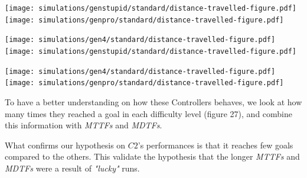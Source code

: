 \begin{minipage}[c]{\textwidth}
	\texttt{[image: simulations/genstupid/standard/distance-travelled-figure.pdf]}
	\vspace{0.5cm}
	\texttt{[image: simulations/genpro/standard/distance-travelled-figure.pdf]}
\end{minipage}

\begin{minipage}[c]{\textwidth}
	\texttt{[image: simulations/gen4/standard/distance-travelled-figure.pdf]}
	\vspace{0.5cm}
	\texttt{[image: simulations/genstupid/standard/distance-travelled-figure.pdf]}
\end{minipage}

\begin{minipage}[c]{\textwidth}
	\texttt{[image: simulations/gen4/standard/distance-travelled-figure.pdf]}
	\vspace{0.5cm}
	\texttt{[image: simulations/genpro/standard/distance-travelled-figure.pdf]}
\end{minipage}


To have a better understanding on how these Controllers behaves, we look at how many times they reached a goal in each difficulty level (figure 27), and combine this information with \textsl{MTTFs} and \textsl{MDTFs}.

What confirms our hypothesis on $C2$'s performances is that it reaches few goals compared to the others. This validate the hypothesis that the longer \textsl{MTTFs} and \textsl{MDTFs} were a result of \textsl{"lucky"} runs.

\vspace{1cm}

